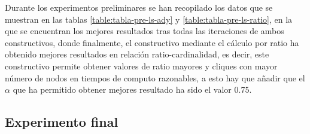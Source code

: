 Durante los experimentos preliminares se han recopilado los datos que se muestran en las tablas \ref{table:tabla-pre-ls-ady} y \ref{table:tabla-pre-ls-ratio}, en la que se encuentran los mejores resultados tras todas las iteraciones de ambos constructivos, donde finalmente, el constructivo mediante el cálculo por ratio ha obtenido mejores resultados en relación ratio-cardinalidad, es decir, este constructivo permite obtener valores de ratio mayores y cliques con mayor número de nodos en tiempos de computo razonables, a esto hay que añadir que el $\alpha$ que ha permitido obtener mejores resultado ha sido el valor 0.75.


\subsection{Experimento final}

\begin{footnotesize}
\end{footnotesize}
	









